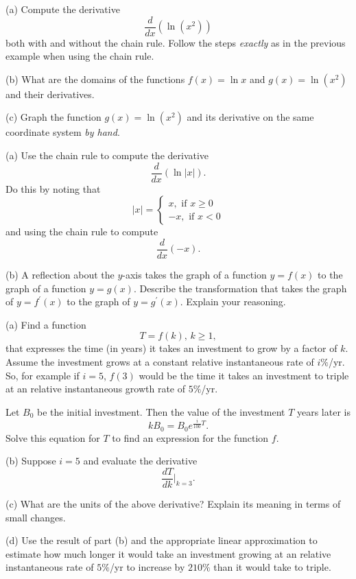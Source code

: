 \documentclass{ximera}
\begin{document}
\begin{question}  \label{Qdfbb44443243}
(a) Compute the derivative 
\[
       \frac{d}{dx} \left( \ln(x^2)  \right)
\]
both with and without the chain rule. Follow the steps \emph{exactly} as in the previous example when using the chain rule.

(b) What are the domains of the functions $f(x)=\ln x$ and $g(x) = \ln (x^2)$ and their derivatives.

(c) Graph the function $g(x) = \ln (x^2)$ and its derivative on the same coordinate system \emph{by hand}.

\end{question}

\begin{question}  \label{Qdefrgbhrdtgr}
(a) Use the chain rule to compute the derivative
\[
   \frac{d}{dx} \left( \ln |x| \right) .
\]
Do this by noting that
\[
|x| = 
\begin{cases}
    x , \text{ if } x\geq 0 \\
   -x ,  \text{ if } x<0
\end{cases}
\]
and using the chain rule to compute 
\[
  \frac{d}{dx}  \left(  -x \right).
\]

(b) A reflection about the $y$-axis takes the graph of a function $y=f(x)$ to the graph of a function $y=g(x)$. Describe the transformation that takes the graph of $y=f^\prime(x)$ to the graph of $y=g^\prime(x)$. Explain your reasoning.

\end{question}

\begin{question} \label{Qmf4566544}
(a) Find a function
\[
      T = f(k) , \, k\geq 1,
\]
that expresses the time (in years) it takes an investment to grow by a factor of $k$. Assume the investment grows at a constant relative instantaneous rate of $i\%$/yr. So, for example if $i=5$, $f(3)$ would be the time it takes an investment to triple at an relative instantaneous growth rate of $5\%$/yr.

\begin{hint}
Let $B_0$ be the initial investment. Then the value of the investment $T$ years later is 
\[
      kB_0  = B_0 e ^{\frac{i}{100}T} .
\]
Solve this equation for $T$ to find an expression for the function $f$.
\end{hint}

(b) Suppose $i=5$ and evaluate the derivative
\[
    \frac{dT}{dk} \Big|_{k=3} .
\]

(c) What are the units of the above derivative? Explain its meaning in terms of small changes.

(d) Use the result of part (b) and the appropriate linear approximation to estimate how much longer it would take an investment growing at an relative instantaneous rate of $5\%$/yr to increase by $210\%$ than it would take to triple.
\end{question}
\end{document}
